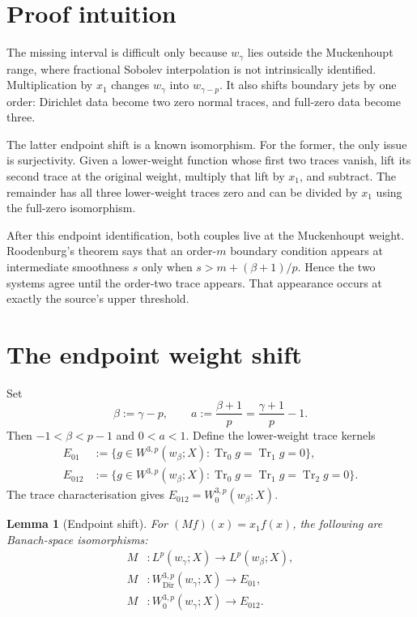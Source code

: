 \documentclass[11pt]{article}
\newtheorem{lemma}[theorem]{Lemma}
\newcommand{\Tr}{\operatorname{Tr}}
\newcommand{\Dir}{\mathrm{Dir}}
\newcommand{\M}{M}
\begin{document}
\section{Proof intuition}

The missing interval is difficult only because $w_\gamma$ lies outside the
Muckenhoupt range, where fractional Sobolev interpolation is not intrinsically
identified.  Multiplication by $x_1$ changes $w_\gamma$ into
$w_{\gamma-p}$.  It also shifts boundary jets by one order:
Dirichlet data become two zero normal traces, and full-zero data become three.

The latter endpoint shift is a known isomorphism.  For the former, the only
issue is surjectivity.  Given a lower-weight function whose first two traces
vanish, lift its second trace at the original weight, multiply that lift by
$x_1$, and subtract.  The remainder has all three lower-weight traces zero and
can be divided by $x_1$ using the full-zero isomorphism.

After this endpoint identification, both couples live at the Muckenhoupt
weight.  Roodenburg's theorem says that an order-$m$ boundary condition appears
at intermediate smoothness $s$ only when $s>m+(\beta+1)/p$.  Hence the two
systems agree until the order-two trace appears.  That appearance occurs at
exactly the source's upper threshold.

\section{The endpoint weight shift}

Set
\[
 \beta:=\gamma-p,\qquad
 a:=\frac{\beta+1}{p}=\frac{\gamma+1}{p}-1.
\]
Then $-1<\beta<p-1$ and $0<a<1$.  Define the lower-weight trace kernels
\begin{align*}
 E_{01}&:=\{g\in W^{3,p}(w_\beta;X):\Tr_0g=\Tr_1g=0\},\\
 E_{012}&:=\{g\in W^{3,p}(w_\beta;X):
                  \Tr_0g=\Tr_1g=\Tr_2g=0\}.
\end{align*}
The trace characterisation gives $E_{012}=W^{3,p}_0(w_\beta;X)$.

\begin{lemma}[Endpoint shift]\label{lem:shift}
For $(\M f)(x)=x_1f(x)$, the following are Banach-space isomorphisms:
\begin{align*}
 \M &:L^p(w_\gamma;X)\longrightarrow L^p(w_\beta;X),\\
 \M &:W^{3,p}_{\Dir}(w_\gamma;X)\longrightarrow E_{01},\\
 \M &:W^{3,p}_0(w_\gamma;X)\longrightarrow E_{012}.
\end{align*}
\end{lemma}
\end{document}
